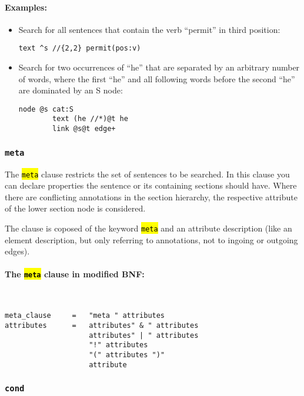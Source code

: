 \documentclass[12pt]{scrartcl}
\newcommand{\code}[1]{\hl{\texttt{#1}}}
\begin{document}
\paragraph*{Examples:}
\begin{itemize}
	\item Search for all sentences that contain the verb “permit” in third position:
	\begin{lstlisting}[gobble=8,aboveskip=.6em,belowskip=.2em]
		text ^s //{2,2} permit(pos:v)
	\end{lstlisting}
	\item Search for two occurrences of “he” that are separated by an arbitrary number of words, where the first “he” and all following words before the second “he” are dominated by an S node:
	\begin{lstlisting}[gobble=8,aboveskip=.6em,belowskip=.2em]
		node @s cat:S
		text (he //*)@t he
		link @s@t edge+
	\end{lstlisting}
\end{itemize}



\subsubsection{\texttt{meta}}

The \code{meta} clause restricts the set of sentences to be searched.
In this clause you can declare properties the sentence or its containing sections should have.
Where there are conflicting annotations in the section hierarchy, the respective attribute of the lower section node is considered.

The clause is coposed of the keyword \code{meta} and an attribute description (like an element description, but only referring to annotations, not to ingoing or outgoing edges).

\paragraph*{The \code{meta} clause in modified BNF:}
~
\begin{lstlisting}
meta_clause     =   "meta " attributes
attributes      =   attributes" & " attributes
                    attributes" | " attributes
                    "!" attributes
                    "(" attributes ")"
                    attribute
\end{lstlisting}


\subsubsection{\texttt{cond}}\label{cond}
\end{document}
